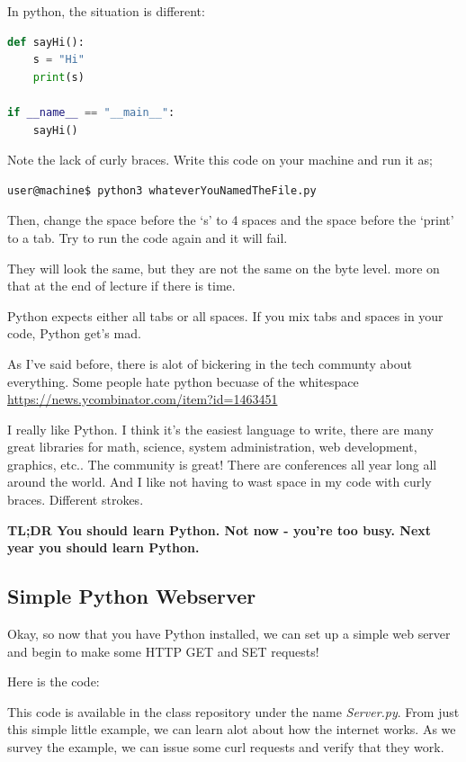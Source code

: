 \documentclass[10pt]{article}
\begin{document}
In python, the situation is different:

\begin{lstlisting}[language=Python]
def sayHi():
	s = "Hi"
	print(s)

if __name__ == "__main__":
	sayHi()
\end{lstlisting}

Note the lack of curly braces. Write this code on your machine and run it as;

\begin{lstlisting}
user@machine$ python3 whateverYouNamedTheFile.py
\end{lstlisting}

Then, change the space before the `s' to 4 spaces and the space before the `print' to a tab. Try to run the code again and it will fail.

 They will look the same, but they are not the same on the byte level. more on that at the end of lecture if there is time. 

Python expects either all tabs or all spaces. If you mix tabs and spaces in your code, Python get's mad.


As I've said before, there is alot of bickering in the tech communty about everything. Some people hate python becuase of the whitespace
\url{https://news.ycombinator.com/item?id=1463451}

I really like Python. I think it's the easiest language to write, there are many great libraries for math, science, system administration, web development, graphics, etc.. The community is great! There are conferences all year long all around the world. And I like not having to wast space in my code with curly braces. Different strokes.

\begin{center}
\textbf{TL;DR You should learn Python. Not now - you're too busy. Next year you should learn Python.}
\end{center}

\subsection{Simple Python Webserver}
Okay, so now that you have Python installed, we can set up a simple web server and begin to make some HTTP GET and SET requests!

Here is the code:


This code is available in the class repository under the name \textit{Server.py}. From just this simple little example, we can learn alot about how the internet works. As we survey the example, we can issue some curl requests and verify that they work.
\end{document}
